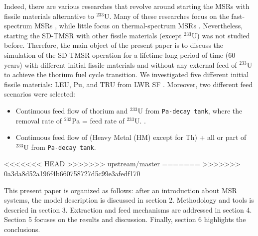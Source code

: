 Indeed, there are various researches that revolve around starting the
\glspl{MSR} with fissile materials alternative to $^{233}$U. Many of these
researches focus on the fast-spectrum \glspl{MSR} \cite{ashraf2019modeling,
ashraf2018nuclear, rykhlevskii_fuel_2019, betzler_impacts_2019,
heuer2014towards,fiorina2013investigation}, while little focus on
thermal-spectrum \glspl{MSR} \cite{betzler2016modeling, zou2018preliminary,
zou2018transition}. Nevertheless, starting the \gls{SD-TMSR} with other
fissile materials (except $^{233}$U) was not studied before. Therefore,
the main object of the present paper is to discuss the simulation of the
\gls{SD-TMSR} operation for a lifetime-long period of time (60 years) with
different initial fissile materials and without any external feed of $^{233}$U
to achieve the thorium fuel cycle transition. We investigated five different
initial fissile materials: \gls{LEU}, Pu, and \gls{TRU} from LWR SF
\cite{de2000scenarios}. Moreover, two different feed scenarios were selected:
\begin{itemize}
	\item Continuous feed flow of thorium and $^{233}$U from \texttt{Pa-decay 
	tank}, where the removal rate of $^{233}$Pa = feed rate of $^{233}$U. 
	\cite{betzler2016modeling}.
	\item Continuous feed flow of (Heavy Metal (HM) except for Th) + all or 
	part of $^{233}$U from \texttt{Pa-decay tank}.
\end{itemize}
<<<<<<< HEAD
>>>>>>> upstream/master
=======
>>>>>>> 0a3da8d52a196f4b660758727d5c99e3afedf170

This present paper is organized as follows: after an introduction about 
\gls{MSR} systems, the model description is discussed in section 2. 
Methodology and tools is descried in section 3. Extraction and feed mechanisms 
are addressed in section 4. Section 5 focuses on the results and discussion. 
Finally, section 6 highlights the conclusions.




